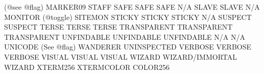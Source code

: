 \documentclass[letterpaper,10pt,english]{sphinxmanual}
\begin{document}
\begin{description}
(@see @flag)            MARKER0\sphinxhyphen{}9                              STAFF
SAFE                    SAFE                                   SAFE
N/A                     SLAVE                                  SLAVE
N/A                     MONITOR (@toggle)                      SITEMON
STICKY                  STICKY                                 STICKY
N/A                     SUSPECT                                SUSPECT
TERSE                   TERSE                                  TERSE
TRANSPARENT             TRANSPARENT                            TRANSPARENT
UNFINDABLE              UNFINDABLE                             UNFINDABLE
N/A                     N/A                                    UNICODE
(See @flag)             WANDERER                               UNINSPECTED
VERBOSE                 VERBOSE                                VERBOSE
VISUAL                  VISUAL                                 VISUAL
WIZARD                  WIZARD/IMMORTAL                        WIZARD
XTERM256                XTERMCOLOR                             COLOR256

\end{description}
\end{document}
